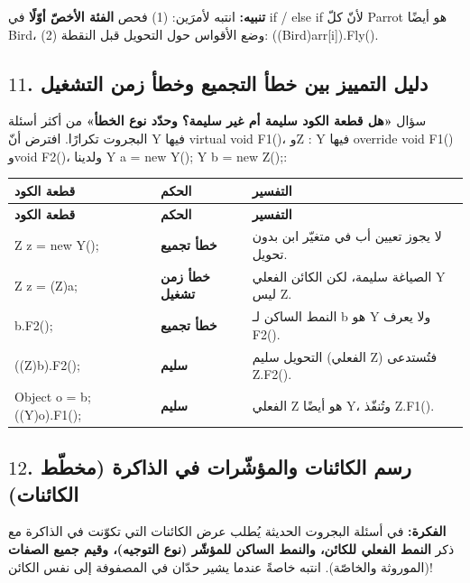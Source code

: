 \documentclass[14pt]{extarticle}
\begin{document}
\textbf{تنبيه:} انتبه لأمرَين: (1) فحص \textbf{الفئة الأخصّ أوّلًا} في \textenglish{if / else if} لأنّ كلّ \textenglish{Parrot} هو أيضًا \textenglish{Bird}، (2) وضع الأقواس حول التحويل قبل النقطة: \textenglish{((Bird)arr[i]).Fly()}.

\filbreak
\subsection*{$11$. دليل التمييز بين خطأ التجميع وخطأ زمن التشغيل}
سؤال \textbf{«هل قطعة الكود سليمة أم غير سليمة؟ وحدّد نوع الخطأ»} من أكثر أسئلة البجروت تكرارًا. افترض أنّ \textenglish{Y} فيها \textenglish{virtual void F1()}، و\textenglish{Z : Y} فيها \textenglish{override void F1()} و\textenglish{void F2()}، ولدينا \textenglish{Y a = new Y(); Y b = new Z();}:

{\renewcommand{\arraystretch}{1.18}
\small
\begin{longtable}{|>{\raggedright\arraybackslash}p{}|C{0.20\textwidth}|>{\raggedleft\arraybackslash}p{0.38\textwidth}|}
\hline
\textbf{قطعة الكود} & \textbf{الحكم} & \textbf{التفسير} \\
\hline
\endfirsthead
\hline
\textbf{قطعة الكود} & \textbf{الحكم} & \textbf{التفسير} \\
\hline
\endhead
\textenglish{Z z = new Y();} & \textbf{خطأ تجميع} & لا يجوز تعيين أب في متغيّر ابن بدون تحويل. \\
\hline
\textenglish{Z z = (Z)a;} & \textbf{خطأ زمن تشغيل} & الصياغة سليمة، لكن الكائن الفعلي \textenglish{Y} ليس \textenglish{Z}. \\
\hline
\textenglish{b.F2();} & \textbf{خطأ تجميع} & النمط الساكن لـ \textenglish{b} هو \textenglish{Y} ولا يعرف \textenglish{F2()}. \\
\hline
\textenglish{((Z)b).F2();} & \textbf{سليم} & التحويل سليم (الفعلي \textenglish{Z}) فتُستدعى \textenglish{Z.F2()}. \\
\hline
\textenglish{Object o = b; ((Y)o).F1();} & \textbf{سليم} & الفعلي \textenglish{Z} هو أيضًا \textenglish{Y}، وتُنفّذ \textenglish{Z.F1()}. \\
\hline
\end{longtable}}

\filbreak
\subsection*{$12$. رسم الكائنات والمؤشّرات في الذاكرة (مخطّط الكائنات)}
\textbf{الفكرة:} في أسئلة البجروت الحديثة يُطلب عرض الكائنات التي تكوّنت في الذاكرة مع ذكر \textbf{النمط الفعلي للكائن، والنمط الساكن للمؤشّر (نوع التوجيه)، وقيم جميع الصفات} (الموروثة والخاصّة). انتبه خاصةً عندما يشير حدّان في المصفوفة إلى نفس الكائن!
\end{document}
